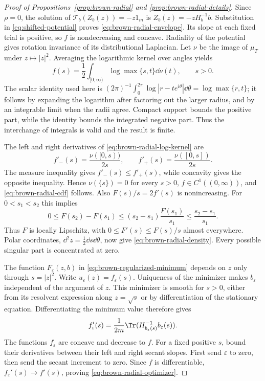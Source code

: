 \begin{proof}[Proof of Propositions~\ref{prop:brown-radial} and
\ref{prop:brown-radial-details}]
Since $\rho=0$, the solution of $\mathcal T_b(Z_b(z))=-z1_m$ is $Z_b(z)=-zH_b^{-1}b$.
Substitution in \eqref{eq:shifted-potential} proves \eqref{eq:brown-radial-envelope}.
Its slope at each fixed trial is positive, so $f$ is nondecreasing and concave.
Radiality of the potential gives rotation invariance of its distributional Laplacian.
Let $\nu$ be the image of $\mu_T$ under $z\mapsto|z|^2$.
Averaging the logarithmic kernel over angles yields
\begin{equation}\label{eq:brown-radial-log-kernel}
 f(s)=\frac12\int_{[0,\infty)}\log\max\{s,t\}\dd\nu(t),
 \qquad s>0.
\end{equation}
The scalar identity used here is $(2\pi)^{-1}\int_0^{2\pi}\log|r-te^{i\theta}|\dd\theta =\log\max\{r,t\}$; it follows by expanding the logarithm after factoring out the larger radius, and by an integrable limit when the radii agree.
Compact support bounds the positive part, while the identity bounds the integrated negative part.
Thus the interchange of integrals is valid and the result is finite.

The left and right derivatives of \eqref{eq:brown-radial-log-kernel} are
\[
 f'_-(s)=\frac{\nu([0,s))}{2s},\qquad
 f'_+(s)=\frac{\nu([0,s])}{2s}.
\]
The measure inequality gives $f'_-(s)\le f'_+(s)$, while concavity gives the opposite inequality.
Hence $\nu(\{s\})=0$ for every $s>0$, $f\in C^1((0,\infty))$, and \eqref{eq:brown-radial-cdf} follows.
Also $F(s)/s=2f'(s)$ is nonincreasing.
For $0<s_1<s_2$ this implies
\[
 0\le F(s_2)-F(s_1)
 \le (s_2-s_1)\frac{F(s_1)}{s_1}
 \le\frac{s_2-s_1}{s_1}.
\]
Thus $F$ is locally Lipschitz, with $0\le F'(s)\le F(s)/s$ almost everywhere.
Polar coordinates, $\dd^2z=\tfrac12\dd s\dd\theta$, now give \eqref{eq:brown-radial-density}.
Every possible singular part is concentrated at zero.

The function $F_\varepsilon(z,b)$ in \eqref{eq:brown-regularized-minimum} depends on $z$ only through $s=|z|^2$.
Write $u_\varepsilon(z)=f_\varepsilon(s)$.
Uniqueness of the minimizer makes $b_\varepsilon$ independent of the argument of $z$.
This minimizer is smooth for $s>0$, either from its resolvent expression along $z=\sqrt{s}$ or by differentiation of the stationary equation.
Differentiating the minimum value therefore gives
\[
 f_\varepsilon'(s)=\frac1{2m}
          \Tr(H_{b_\varepsilon(s)}^{-1}b_\varepsilon(s)).
\]
The functions $f_\varepsilon$ are concave and decrease to $f$.
For a fixed positive $s$, bound their derivatives between their left and right secant slopes.
First send $\varepsilon$ to zero, then send the secant increment to zero.
Since $f$ is differentiable, $f_\varepsilon'(s)\to f'(s)$, proving \eqref{eq:brown-radial-optimizer}.


\end{proof}

